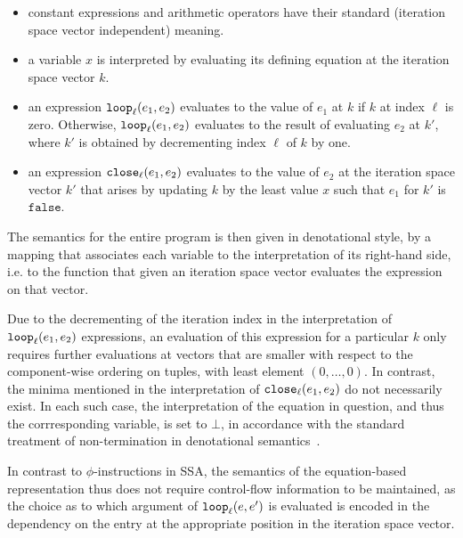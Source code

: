 \begin{itemize} 

\item 
constant expressions and arithmetic operators have their standard
(iteration space vector independent) meaning.

\item a variable $x$ is interpreted by evaluating its defining
equation at the iteration space vector $k$.

\item an expression $\mathtt{loop}_{{\ell}}({e_1},{e_2})$ evaluates to the value of
$e_1$ at $k$ if $k$ at index $\ell$ is zero. Otherwise, $\mathtt{loop}_{{\ell}}({e_1},{e_2})$ evaluates to the result of evaluating $e_2$ at $k'$,
where $k'$ is obtained by decrementing index $\ell$ of $k$ by one.

\item an expression $\mathtt{close}_{{\ell}}({e_1},{e_2})$ evaluates to the value
of $e_2$ at the iteration space vector $k'$ that arises by updating
$k$ by the least value $x$ such that $e_1$ for $k'$ is
$\mathtt{false}$.

\end{itemize}

The semantics for the entire program is then given in denotational
style, by a mapping that associates each variable to the
interpretation of its right-hand side, i.e. to the function that given
an iteration space vector evaluates the expression on that vector.

Due to the decrementing of the iteration index in the interpretation
of $\mathtt{loop}_{{\ell}}({e_1},{e_2})$ expressions, an evaluation of this
expression for a particular $k$ only requires further evaluations at
vectors that are smaller with respect to the component-wise ordering
on tuples, with least element $(0,\ldots,0)$. In contrast, the minima
mentioned in the interpretation of $\mathtt{close}_{{\ell}}({e_1},{e_2})$ do not necessarily exist. In each such case, the interpretation
of the equation in question, and thus the corrresponding variable, is
set to $\bot$, in accordance with the standard treatment of
non-termination in denotational semantics~\cite{winskel_93_formal}.

In contrast to $\phi$-instructions in SSA, the semantics of the
equation-based representation thus does not require control-flow
information to be maintained, as the choice as to which argument of
$\mathtt{loop}_{{\ell}}({e},{e'})$ is evaluated is encoded in the dependency on
the entry at the appropriate position in the iteration space vector.

